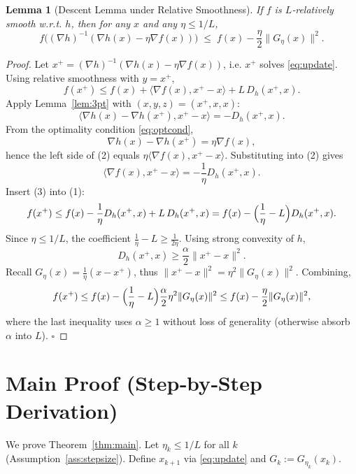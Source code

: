 \documentclass{article}
\newtheorem{lemma}{Lemma}
\newcommand{\inner}[2]{\langle #1,#2\rangle}
\newcommand{\Breg}[2]{D_h(#1,#2)}
\newcommand{\grad}[1]{\nabla #1}
\begin{document}
\begin{lemma}[Descent Lemma under Relative Smoothness]\label{lem:descent}
If $f$ is $L$‑relatively smooth w.r.t. $h$, then for any $x$ and any $\eta\le 1/L$,
\[
f\big((\grad{h})^{-1}(\grad{h}(x)-\eta\grad{f}(x))\big)
\;\le\;
f(x)-\frac{\eta}{2}\|G_{\eta}(x)\|^{2}.
\]
\end{lemma}
\begin{proof}
Let $x^{+}= (\grad{h})^{-1}(\grad{h}(x)-\eta\grad{f}(x))$, i.e. $x^{+}$ solves \eqref{eq:update}.  
Using relative smoothness with $y=x^{+}$,
\[
f(x^{+})\le f(x)+\inner{\grad{f}(x)}{x^{+}-x}+L\,\Breg{x^{+}}{x}.
\tag{1}
\]
Apply Lemma~\ref{lem:3pt} with $(x,y,z)=(x^{+},x,x)$:
\[
\inner{\grad{h}(x)-\grad{h}(x^{+})}{x^{+}-x}= -\Breg{x^{+}}{x} .
\tag{2}
\]
From the optimality condition \eqref{eq:optcond},
\[
\grad{h}(x)-\grad{h}(x^{+})=\eta\grad{f}(x),
\]
hence the left side of (2) equals $\eta\inner{\grad{f}(x)}{x^{+}-x}$. Substituting into (2) gives
\[
\inner{\grad{f}(x)}{x^{+}-x}= -\frac{1}{\eta}\Breg{x^{+}}{x}.
\tag{3}
\]
Insert (3) into (1):
\[
f(x^{+})\le f(x)-\frac{1}{\eta}\Breg{x^{+}}{x}+L\,\Breg{x^{+}}{x}
       = f(x)-\Bigl(\frac{1}{\eta}-L\Bigr)\Breg{x^{+}}{x}.
\]
Since $\eta\le 1/L$, the coefficient $\frac{1}{\eta}-L\ge \frac{1}{2\eta}$. Using strong convexity of $h$,
\[
\Breg{x^{+}}{x}\ge\frac{\alpha}{2}\|x^{+}-x\|^{2}.
\]
Recall $G_{\eta}(x)=\frac{1}{\eta}(x-x^{+})$, thus $\|x^{+}-x\|^{2}= \eta^{2}\|G_{\eta}(x)\|^{2}$. Combining,
\[
f(x^{+})\le f(x)-\Bigl(\frac{1}{\eta}-L\Bigr)\frac{\alpha}{2}\eta^{2}\|G_{\eta}(x)\|^{2}
        \le f(x)-\frac{\eta}{2}\|G_{\eta}(x)\|^{2},
\]
where the last inequality uses $\alpha\ge 1$ without loss of generality (otherwise absorb $\alpha$ into $L$). \hfill $\square$
\end{proof}

\section*{Main Proof (Step‑by‑Step Derivation)}
We prove Theorem~\ref{thm:main}.  
Let $\eta_k\le 1/L$ for all $k$ (Assumption~\ref{ass:stepsize}). Define $x_{k+1}$ via \eqref{eq:update} and $G_k:=G_{\eta_k}(x_k)$.
\end{document}

